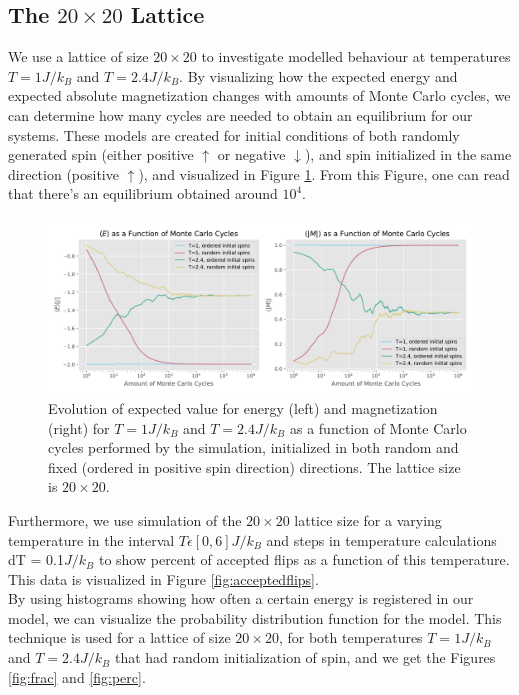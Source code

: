 \documentclass[10pt, nofootinbib, twocolumn]{revtex4-1}
\begin{document}
\subsection{The $20\times 20$ Lattice}
We use a lattice of size $20\times 20$ to investigate modelled behaviour at temperatures $T=1J/k_B$ and $T=2.4J/k_B$. By visualizing how the expected energy and expected absolute magnetization changes with amounts of Monte Carlo cycles, we can determine how many cycles are needed to obtain an equilibrium for our systems. These models are created for initial conditions of both randomly generated spin (either positive $\uparrow$ or negative $\downarrow$), and spin initialized in the same direction (positive $\uparrow$), and visualized in Figure \ref{fig:cycleamount}. From this Figure, one can read that there's an equilibrium obtained around $10^4$.
\begin{figure}
    \centering
    \includegraphics[width=1\textwidth]{figures/20x20randord.pdf} 
    \caption{Evolution of expected value for energy (left) and magnetization (right) for $T=1J/k_B$ and $T=2.4J/k_B$ as a function of Monte Carlo cycles performed by the simulation, initialized in both random and fixed (ordered in positive spin direction) directions. The lattice size is $20\times 20$.}
    \label{fig:cycleamount}
\end{figure}
Furthermore, we use simulation of the $20\times 20$ lattice size for a varying temperature in the interval $T\epsilon [0 , 6] J/k_B$ and steps in temperature calculations dT = 0.1$J/k_B$ to show percent of accepted flips as a function of this temperature. This data is visualized in Figure \ref{fig:acceptedflips}. \\

By using histograms showing how often a certain energy is registered in our model, we can visualize the probability distribution function for the model. This technique is used for a lattice of size $20\times 20$, for both temperatures $T=1J/k_B$ and $T=2.4J/k_B$ that had random initialization of spin, and we get the Figures \ref{fig:frac} and \ref{fig:perc}. 
\end{document}
